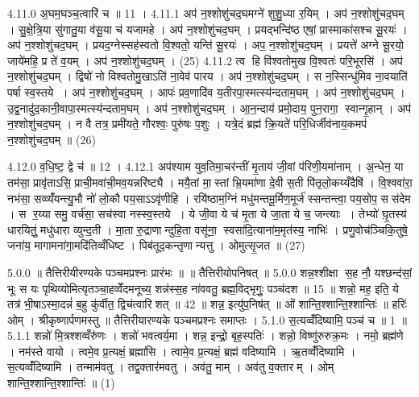 4.11.0
अ॒घम॒घञ्च॒त्वारि॑ च ॥ 11 ।
4.11.1
अप॑ न॒श्शोशु॑चद॒घमग्ने॑ शुशु॒ध्या र॒यिम् । अप॑ न॒श्शोशु॑चद॒घम् । सु॒क्षे॒त्रि॒या सु॑गातु॒या व॑सू॒या च॑ यजामहे । अप॑ न॒श्शोशु॑चद॒घम् । प्रयद्भन्दि॑ष्ठ एषां॒ प्रास्माका॑सश्च सू॒रयः॑ । अप॑ न॒श्शोशु॑चद॒घम् । प्रयद॒ग्नेस्सह॑स्वतो वि॒श्वतो॒ यन्ति॑ सू॒रयः॑ । अप॒ न॒श्शोशु॑चद॒घम् । प्रयत्ते॑ अग्ने सू॒रयो॒ जाये॑महि॒ प्र ते॑ व॒यम् । अप॑ न॒श्शोशु॑चद॒घम् । (25)
4.11.2
त्व हि वि॑श्वतोमुख वि॒श्वतः॑ परि॒भूरसि॑ । अप॑ न॒श्शोशु॑चद॒घम् । द्विषो॑ नो विश्वतोमु॒खाऽति॑ ना॒वेव॑ पारय । अप॑ न॒श्शोशु॑चद॒घम् । स न॒स्सिन्धु॑मिव ना॒वयाति॑ पर्\mbox{}षा स्व॒स्तये । अप॑ न॒श्शोशु॑चद॒घम् । आपः॑ प्रव॒णादि॑व य॒तीरपा॒स्मत्स्य॑न्दताम॒घम् । अप॑ न॒श्शोशु॑चद॒घम् । उ॒द्व॒नादु॑द॒कानी॒वापा॒स्मत्स्य॑न्दताम॒घम् । अप॑ न॒श्शोशु॑चद॒घम् । आ॒न॒न्दाय॑ प्रमो॒दाय॒ पुन॒रागा॒ स्वान्गृ॒हान् । अप॑ न॒श्शोशु॑चद॒घम् । न वै तत्र॒ प्रमी॑यते॒ गौरश्वः॒ पुरु॑षः प॒शुः । यत्रे॒दं ब्रह्म॑ क्रि॒यते॑ परि॒धिर्जीव॑नाय॒कमप॑ न॒श्शोशु॑चद॒घम् ॥ (26)
\anuvakamend

4.12.0
व॒धि॒ष्ट॒ द्वे च॑ ॥ 12 ।
4.12.1
अप॑श्याम युव॒तिमा॒चर॑न्तीं मृ॒ताय॑ जी॒वां प॑रिणी॒यमा॑नाम् । अ॒न्धेन॒ या तम॑सा॒ प्रावृ॑ताऽसि॒ प्राची॒मवा॑ची॒मव॒यन्नरि॑ष्ट्यै । मयै॒तां मा॒स्तां भ्रि॒यमा॑णा दे॒वी स॒ती पि॑तृलो॒कय्यँदैषि॑ । वि॒श्ववा॑रा॒ नभ॑सा॒ सव्व्यँ॑यन्त्यु॒भौ नो॑ लो॒कौ पय॒साऽऽवृ॑णीहि । रयि॑ष्ठाम॒ग्निं मधु॑मन्तमू॒र्मिण॒मूर्ज॑ स्सन्तन्त्वा॒ पय॒सोप॒ सस॑देम । स र॒य्या समु॒ वर्च॑सा॒ सच॑स्वा नस्स्व॒स्तये । ये जी॒वा ये च॑ मृ॒ता ये जा॒ता ये च॒ जन्त्याः । तेभ्यो॑ घ़ृ॒तस्य॑ धारयितुं॒ मधु॑धारा व्युन्द॒ती । मा॒ता रु॒द्राणान्दुहि॒ता वसू॑ना॒ स्वसा॑दि॒त्याना॑म॒मृत॑स्य॒ नाभिः॑ । प्रणु॒वोच॑ञ्चिकि॒तुषे॒ जना॑य॒ मागामना॑गा॒मदि॑तिव्वँधिष्ट । पिब॑तूद॒कन्तृणान्यत्तु । ओमुत्सृ॒जत ॥ (27)

\setcounter{anuvakam}{0}
5.0.0
॥ तैत्तिरीयीरण्यके पञ्चमप्रश्नः प्रारंभः ॥ ॥ तैत्तिरीयोपनिषत् ॥
5.0.0
शन्न॒श्शीक्षा स॒ह नौ॒ यश्छन्द॑सां॒ भूः स यः पृथिव्योमित्यृतञ्चा॒हव्वेँदमनूच्य॒ शन्न॑स्स॒ह ना॑ववतु॒ ब्रह्म॒विद्भृगुः॒ पञ्च॑दश ॥ 15 ॥ शन्नो॒ मह॒ इति॒ ये तत्र॑ भी॒षाऽस्मा॒दन्नं॑ ब॒हु कु॑र्वीत॒ द्विच॑त्वारिशत् ॥ 42 ॥ शन्न॒ इत्यु॑प॒निष॑त् ॥ ओं शान्ति॒श्शान्ति॒श्शान्तिः॑ ॥ हरिः॑ ओम् । श्रीकृष्णार्पणमस्तु ॥ तैत्तिरीयारण्यके पञ्चमप्रश्नः समाप्तः ।
5.1.0
स॒त्यव्वँ॑दिष्यामि॒ पञ्च॑ च ॥ 1 ॥
5.1.1
शन्नो॑ मि॒त्रश्शव्वँरु॑णः । शन्नो॑ भवत्वर्य॒मा । शन्न॒ इन्द्रो॒ बृह॒स्पतिः॑ । शन्नो॒ विष्णु॑रुरुक्र॒मः । नमो॒ ब्रह्म॑णे । नम॑स्ते वायो । त्वमे॒व प्र॒त्यक्षं॒ ब्रह्मा॑सि । त्वामे॒व प्र॒त्यक्षं॒ ब्रह्म॑ वदिष्यामि । ऋ॒तव्वँ॑दिष्यामि । स॒त्यव्वँ॑दिष्यामि । तन्माम॑वतु । तद्व॒क्तार॑मवतु । अव॑तु॒ माम् । अव॑तु व॒क्तारम् । ओम् शान्ति॒श्शान्ति॒श्शान्तिः॑ ॥ (1)
\anuvakamend

